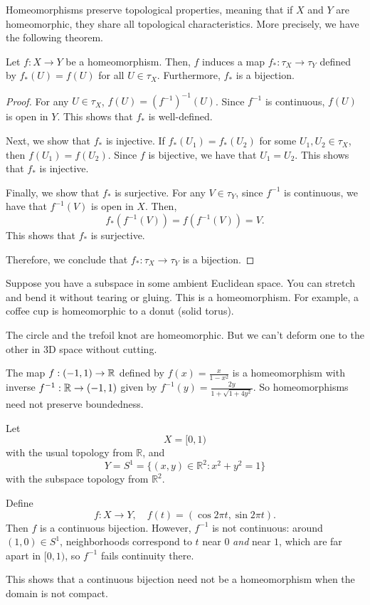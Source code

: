 Homeomorphisms preserve topological properties, meaning that if \(X\) and \(Y\) are homeomorphic, they share all topological characteristics. More precisely, we have the following theorem.

\begin{theorem}
  Let $f:X\to Y$ be a homeomorphism. Then, $f$ induces a map $f_*:\tau_X\to\tau_Y$ defined by $f_*(U)=f(U)$ for all $U\in\tau_X$. Furthermore, $f_*$ is a bijection.
\end{theorem}
\begin{proof}
  For any $U\in\tau_X$, $f(U)=(f^{-1})^{-1}(U)$. Since $f^{-1}$ is continuous, $f(U)$ is open in $Y$. This shows that $f_*$ is well-defined.

  Next, we show that $f_*$ is injective. If $f_*(U_1)=f_*(U_2)$ for some $U_1,U_2\in\tau_X$, then $f(U_1)=f(U_2)$. Since $f$ is bijective, we have that $U_1=U_2$. This shows that $f_*$ is injective.

  Finally, we show that $f_*$ is surjective. For any $V\in\tau_Y$, since $f^{-1}$ is continuous, we have that $f^{-1}(V)$ is open in $X$. Then, 
  \[
    f_*(f^{-1}(V))=f(f^{-1}(V))=V.
  \]
  This shows that $f_*$ is surjective.

  Therefore, we conclude that $f_*:\tau_X\to\tau_Y$ is a bijection.
\end{proof}

\begin{example}
  Suppose you have a subspace in some ambient Euclidean space. You can stretch and bend it without tearing or gluing. This is a homeomorphism. For example, a coffee cup is homeomorphic to a donut (solid torus).
\end{example}

\begin{example}
  The circle and the trefoil knot are homeomorphic. But we can't deform one to the other in 3D space without cutting. 
\end{example}

\begin{example}
  The map $f:(-1,1)\to \mathbb{R}$ defined by $f(x)=\frac{x}{1-x^2}$ is a homeomorphism with inverse $f^{-1}: \mathbb{R} \to (-1,1)$ given by $f^{-1}(y)=\frac{2y}{1+\sqrt{1+4y^2}}$. So homeomorphisms need not preserve boundedness. 
\end{example}


\begin{example}
Let
\[
X = [0, 1)
\]
with the usual topology from $\mathbb{R}$, and
\[
Y = S^1 = \{ (x,y) \in \mathbb{R}^2 : x^2 + y^2 = 1 \}
\]
with the subspace topology from $\mathbb{R}^2$.

Define
\[
f: X \to Y, \quad f(t) = (\cos 2\pi t, \sin 2\pi t).
\]
Then $f$ is a continuous bijection. However, $f^{-1}$ is not continuous: around $(1, 0) \in S^1$, neighborhoods correspond to $t$ near $0$ \emph{and} near $1$,  
  which are far apart in $[0,1)$, so $f^{-1}$ fails continuity there.

\noindent
This shows that a continuous bijection need not be a homeomorphism when the domain is not compact.
\end{example}


